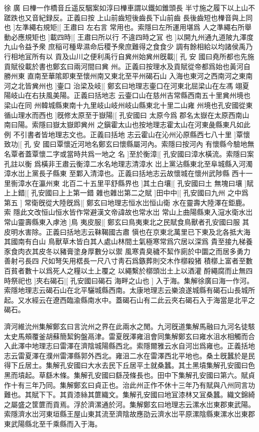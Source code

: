 徐%
廣%
%
曰檋一作橋音丘遥反駰案如淳曰檋車謂以鐵如錐頭長%
半寸施之履下以上山不蹉跌也又音紀録反。正義曰按%
%
上山前齒短後齒長下山前齒%
長後齒短也檋音與上同也%
]左準繩右規矩|[%
王肅曰%
左右言%
%
常用也。索隱曰左所運用堪爲%
人之準繩右所舉動必應規矩也%
]載四時|[%
王肅曰所以行%
不違四時之冝%
%
也%
%
]以開九州通九道陂九澤度九山令益予衆%
庶稲可種卑濕命后稷予衆庶難得之食食少%
調有餘相給以均諸侯禹乃行相地冝所有以%
貢及山川之便利禹行自兾州始兾州旣載|[%
孔%
安%
%
國曰堯所都也先施貢賦役載於書也鄭玄曰兩河間曰兾%
州。正義曰按理水及貢賦從帝都爲始也黃河自勝州東%
%
直南至華隂即東至懷州南又東北至平州碣石山%
入海也東河之西南河之東南河之北皆兾州也%
]壷口%
治梁及岐|[%
鄭玄曰地理志壷口在河東北屈梁山在左馮%
翊夏陽岐山在右扶風美陽。正義曰括地志%
%
云壷口山在慈州吉常縣西南五十里兾州境也梁山在同%
州韓城縣東南十九里岐山岐州岐山縣東北十里二山雍%
%
州境也孔安國從東%
循山理水而西也%
]旣修太原至于嶽陽|[%
孔安國曰%
太原今爲%
%
郡名太嶽在太原西南山南曰陽。索隱曰嶽太嶽即兾州%
之鎭霍太山也按地理志霍太山在河東彘縣東凡如此例%
%
不引書者皆地理志文也。正義曰括地%
志云霍山在沁州沁原縣西七八十里%
]覃懷致功|[%
孔%
安%
%
國曰覃懷近河地名鄭玄曰懷縣屬河內。索隱曰按河內%
有懷縣今驗地無名覃者蓋覃懷二字或當時共爲一地之%
%
名%
%
]至於衡漳|[%
孔安國曰漳水橫流。索隱曰案孔註以衡%
爲橫非王肅云衡漳二水名地理志清漳水%
%
岀上黨沾縣東北至阜城縣入河濁漳水岀上黨長子縣東%
至鄴入清漳也。正義曰括地志云故懷城在懷州武陟縣%
%
西十一里𢖍漳水在瀛州東%
北百二十五里平舒縣界也%
]其土白壤|[%
孔安國曰土%
無塊曰壤%
]賦%
上上錯|[%
孔安國曰上上第一錯%
雜也雜岀第二之賦%
]田中中|[%
孔安國曰九州%
之中爲第五%
]%
常衛旣從大陸旣爲|[%
鄭玄曰地理志恒水岀恒山衛%
水在靈壽大陸澤在鉅鹿。索%
%
隱此文改恒山恒水皆作常避漢文帝諱故也常水岀%
常山上曲陽縣東入滱水衛水岀常山靈壽縣東入虖池%
]鳥%
夷皮服|[%
鄭玄曰鳥夷東北之民賦食鳥獸者孔安國曰服%
其皮明水害除。正義曰括地志云靺鞨國古肅%
%
愼也在京東北萬里已下東及北各抵大海其國南有白山%
鳥獸草木皆白其人處山林間土氣極寒常爲穴居以深爲%
%
貴至接九梯養豕食肉衣其皮冬以豬膏塗身厚數分以禦%
風寒貴臭穢不絜作廁於中圜之而居多勇力善射弓長四%
%
尺如弩矢用楛長一尺八寸靑石爲鏃葬則交木作槨殺猪%
積槨上富者至數百貧者數十以爲死人之糧以土上覆之%
%
以繩繫於槨頭岀土上以酒灌%
酹繩腐而止無四時祭祀也%
]夾右碣石|[%
孔安國曰碣石%
海畔之山也%
]%
入于海。集解徐廣曰海一作河。索隱地理志云碣石山在北平驪城縣西南。太康地理志云樂浪遂城縣有碣石山長城所起。又水經云在遼西臨渝縣南水中。蓋碣石山有二此云夾右碣石入于海當是北平之碣石。

濟河維沇州集解鄭玄曰言沇州之界在此兩水之閒。九河旣道集解馬融曰九河名徒駭太史馬頰覆釜胡蘇簡絜鉤盤鬲津。雷夏旣澤雍沮會同集解鄭玄曰雍水沮水相觸而合入此澤中地理志曰雷澤在濟陰城陽縣西北。索隱爾雅云水自河岀爲雍也。正義括地志云雷夏澤在濮州雷澤縣郭外西北。雍沮二水在雷澤西北平地也。桑土旣蠶於是民得下丘居土。集解孔安國曰大水去民下丘居平土就桑蠶。其土黑墳集解孔安國曰色黑而墳起。草繇木條。集解孔安國曰繇茂條長也。田中下集解孔安國曰第六。賦貞作十有三年乃同。集解鄭玄曰貞正也。治此州正作不休十三年乃有賦與八州同言功難也。其賦下下。其貢漆絲其篚織文。集解孔安國曰地冝漆林又冝桑蠶。織文錦綺之屬盛之筐篚而貢焉。浮於濟漯通於河。集解鄭玄曰地理志云漯水岀東郡東武陽。索隱濟水岀河東垣縣王屋山東其流至濟陰故應劭云濟水岀平原漯陰縣東漯水岀東郡東武陽縣北至千乘縣而入于海。

